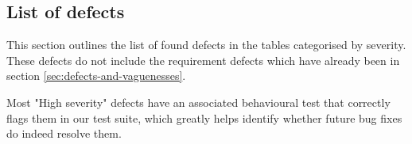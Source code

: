 \subsection{List of defects}

This section outlines the list of found defects in the tables categorised by severity. These defects do not include the requirement defects which have already been in section \ref{sec:defects-and-vaguenesses}. 
\par 

Most "High severity" defects have an associated behavioural test that correctly flags them in our test suite, which greatly helps identify whether future bug fixes do indeed resolve them.






